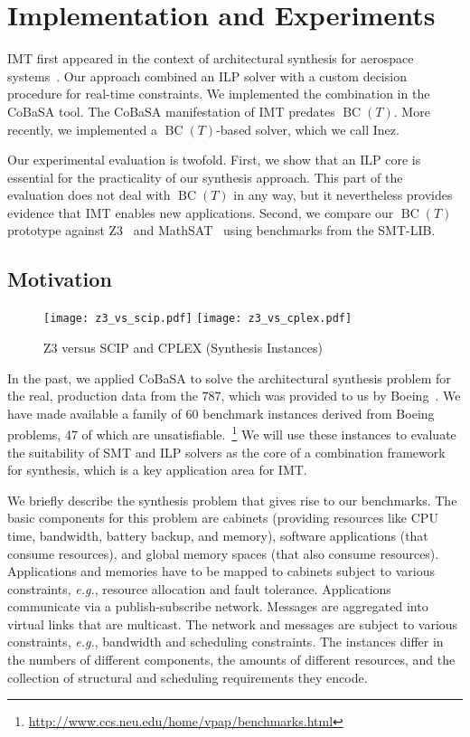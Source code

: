 \documentclass{llncs}
\newcommand{\cobasa}[0]{\textsf{CoBaSA}}
\newcommand{\inez}[0]{\textsf{Inez}}
\newcommand{\eg}[0]{\emph{e.g.}, }
\newcommand{\bct}[0]{\ensuremath{\operatorname{BC}(T)}}
\begin{document}
\section{Implementation and Experiments}
\label{sec:experiments}

IMT first appeared in the context of architectural synthesis for
aerospace systems~\cite{hmp11}. Our approach combined an ILP solver
with a custom decision procedure for real-time constraints. We
implemented the combination in the \cobasa{} tool. The \cobasa{}
manifestation of IMT predates \bct{}. More recently, we implemented a
\bct{}-based solver, which we call \inez{}.

Our experimental evaluation is twofold. First, we show that an ILP
core is essential for the practicality of our synthesis approach. This
part of the evaluation does not deal with \bct{} in any way, but it
nevertheless provides evidence that IMT enables new
applications. Second, we compare our \bct{} prototype against
Z3~\cite{z3} and MathSAT~\cite{mathsatlia} using benchmarks from the
SMT-LIB.

\subsection{Motivation}

\begin{figure}[t]
\texttt{[image: z3\_vs\_scip.pdf]}
\texttt{[image: z3\_vs\_cplex.pdf]}
\caption{Z3 versus SCIP and CPLEX (Synthesis Instances)}
\label{fig:synthesis}
\end{figure}

In the past, we applied \cobasa{} to solve the architectural synthesis
problem for the real, production data from the 787, which was provided
to us by Boeing~\cite{hmp11}. We have made available a family of 60
benchmark instances derived from Boeing problems, 47 of which are
unsatisfiable.~\footnote{\url{http://www.ccs.neu.edu/home/vpap/benchmarks.html}}
We will use these instances to evaluate the suitability of SMT and ILP
solvers as the core of a combination framework for synthesis, which is
a key application area for IMT.

We briefly describe the synthesis problem that gives rise to our
benchmarks. The basic components for this problem are cabinets
(providing resources like CPU time, bandwidth, battery backup,
and memory), software applications (that consume resources), and
global memory spaces (that also consume resources). Applications
and memories have to be mapped to cabinets subject to various
constraints, \eg resource allocation and fault
tolerance. Applications communicate via a publish-subscribe
network. Messages are aggregated into virtual links that are
multicast. The network and messages are subject to various
constraints, \eg bandwidth and scheduling constraints.  The
instances differ in the numbers of different components, the
amounts of different resources, and the collection of structural
and scheduling requirements they encode.
\end{document}
